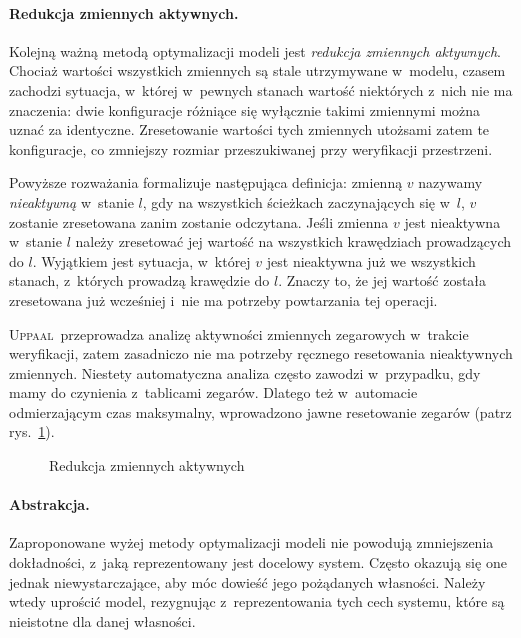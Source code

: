 \documentclass{pracamgr}
\newcommand{\imgr}[1]{rys.~\ref{#1}}
\newcommand{\upp}{\textsc{Uppaal}}
\theoremstyle{plain}
\begin{document}
\paragraph{Redukcja zmiennych aktywnych.} Kolejną ważną metodą
optymalizacji modeli jest \emph{redukcja zmiennych aktywnych}.
Chociaż wartości wszystkich zmiennych są stale utrzymywane w~modelu,
czasem zachodzi sytuacja, w~której w~pewnych stanach wartość
niektórych z~nich nie ma znaczenia: dwie konfiguracje różniące się wyłącznie
takimi zmiennymi można uznać za identyczne. Zresetowanie wartości tych
zmiennych utożsami zatem te konfiguracje, co zmniejszy rozmiar przeszukiwanej
przy weryfikacji przestrzeni.

Powyższe rozważania formalizuje następująca definicja: zmienną $v$
nazywamy \emph{nieaktywną} w~stanie $l$, gdy na wszystkich
ścieżkach zaczynających się w~$l$, $v$ zostanie zresetowana zanim
zostanie odczytana. Jeśli zmienna $v$ jest nieaktywna w~stanie
$l$ należy zresetować jej wartość na wszystkich krawędziach
prowadzących do $l$. Wyjątkiem jest sytuacja, w~której $v$ jest
nieaktywna już we wszystkich stanach, z~których prowadzą
krawędzie do $l$. Znaczy to, że jej wartość została zresetowana już wcześniej
i~nie ma potrzeby powtarzania tej operacji.

\upp\ przeprowadza analizę aktywności zmiennych zegarowych w~trakcie
weryfikacji, zatem zasadniczo nie ma potrzeby ręcznego resetowania
nieaktywnych zmiennych. Niestety automatyczna analiza często zawodzi
w~przypadku, gdy mamy do czynienia z~tablicami zegarów. Dlatego też
w~automacie odmierzającym czas maksymalny, wprowadzono jawne resetowanie
zegarów (patrz \imgr{img:models-active-reduction}).

\begin{figure}
  \centering
  \hfill
  \caption{Redukcja zmiennych aktywnych}
  \label{img:models-active-reduction}
\end{figure}

\paragraph{Abstrakcja.} Zaproponowane wyżej metody optymalizacji modeli
nie powodują zmniejszenia dokładności, z~jaką reprezentowany jest
docelowy system. Często okazują się one jednak niewystarczające, aby
móc dowieść jego pożądanych własności. Należy wtedy uprościć model,
rezygnując z~reprezentowania tych cech systemu, które są nieistotne
dla danej własności.
\end{document}
